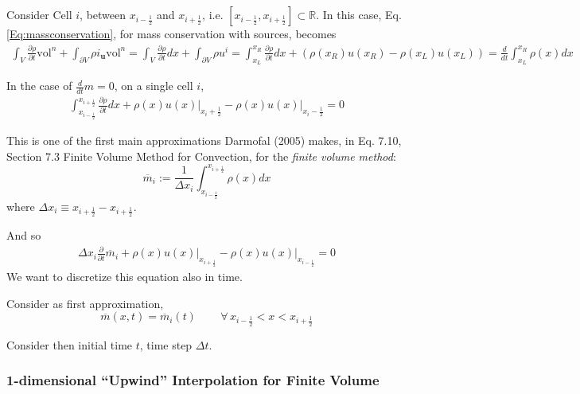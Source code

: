 \documentclass[10pt]{amsart}
\begin{document}
\begin{multicols*}{2}
Consider Cell $i$, between $x_{i-\frac{1}{2} }$ and $ x_{i+\frac{1}{2} }$, i.e. $[x_{i-\frac{1}{2} }, x_{i+\frac{1}{2} }]\subset \mathbb{R}$.  In this case, Eq. \ref{Eq:massconservation}, for mass conservation with sources, becomes
\[
\begin{gathered}
  \int_V \frac{ \partial \rho}{ \partial t} \text{vol}^n + \int_{\partial V} \rho i_{\mathbf{u}} \text{vol}^n = \int_V \frac{ \partial \rho }{ \partial t} dx + \int_{\partial V} \rho u^i = \int_{x_L}^{x_R} \frac{ \partial \rho }{ \partial t} dx + (\rho(x_R)u(x_R) - \rho(x_L)u(x_L) ) = \frac{d}{dt} \int_{x_L}^{x_R} \rho(x) dx
  \end{gathered}
\]

In the case of $\frac{d}{dt}m = 0$, on a single cell $i$,
\[
\begin{gathered}
  \int_{x_{i-\frac{1}{2} }}^{x_{i+\frac{1}{2} } } \frac{ \partial \rho }{ \partial t} dx + \left. \rho(x) u(x) \right|_{x_i + \frac{1}{2} } - \left. \rho(x)u(x) \right|_{x_i-\frac{1}{2} } = 0 
  \end{gathered}
\]

This is one of the first main approximations Darmofal (2005) \cite{Darm2005} makes, in Eq. 7.10, Section 7.3 Finite Volume Method for Convection, for the \emph{finite volume method}:
\begin{equation}
  \overline{m}_i := \frac{1}{\Delta x_i} \int_{x_{i - \frac{1}{2} }}^{x_{i+\frac{1}{2} } } \rho(x)dx
\end{equation}
where $\Delta x_i \equiv x_{i+\frac{1}{2}} - x_{i+\frac{1}{2}}$.

And so
\begin{equation}
  \begin{gathered}
    \Delta x_i \frac{\partial }{ \partial t} \overline{m}_i + \left. \rho(x)u(x) \right|_{x_{i+\frac{1}{2} } } - \left. \rho(x)u(x) \right|_{x_{i-\frac{1}{2} } } =0
  \end{gathered}
  \end{equation}
We want to discretize this equation also in time.

Consider as first approximation,
\begin{equation}
  \overline{m}(x,t) = \overline{m}_i(t) \qquad \, \forall \, x_{i-\frac{1}{2}} < x < x_{i+\frac{1}{2}}
\end{equation}

Consider then initial time $t$, time step $\Delta t$.   

\subsubsection{1-dimensional ``Upwind'' Interpolation for Finite Volume}


\end{multicols*}
\end{document}
